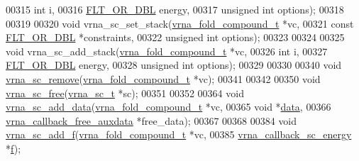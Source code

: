 \begin{DoxyCode}
00315                     \textcolor{keywordtype}{int}                   i,
00316                     \hyperlink{group__data__structures_ga31125aeace516926bf7f251f759b6126}{FLT\_OR\_DBL}            energy,
00317                     \textcolor{keywordtype}{unsigned} \textcolor{keywordtype}{int}          options);
00318 
00319 
00320 \textcolor{keywordtype}{void} vrna\_sc\_set\_stack(\hyperlink{group__fold__compound_structvrna__fc__s}{vrna\_fold\_compound\_t} *vc,
00321                        \textcolor{keyword}{const} \hyperlink{group__data__structures_ga31125aeace516926bf7f251f759b6126}{FLT\_OR\_DBL}     *constraints,
00322                        \textcolor{keywordtype}{unsigned} \textcolor{keywordtype}{int}         options);
00323 
00324 
00325 \textcolor{keywordtype}{void} vrna\_sc\_add\_stack(\hyperlink{group__fold__compound_structvrna__fc__s}{vrna\_fold\_compound\_t} *vc,
00326                        \textcolor{keywordtype}{int}                  i,
00327                        \hyperlink{group__data__structures_ga31125aeace516926bf7f251f759b6126}{FLT\_OR\_DBL}           energy,
00328                        \textcolor{keywordtype}{unsigned} \textcolor{keywordtype}{int}         options);
00329 
00330 
00340 \textcolor{keywordtype}{void} \hyperlink{group__soft__constraints_ga73cdc07b9a199c614367bebef0f2c41a}{vrna\_sc\_remove}(\hyperlink{group__fold__compound_structvrna__fc__s}{vrna\_fold\_compound\_t} *vc);
00341 
00342 
00350 \textcolor{keywordtype}{void} \hyperlink{group__soft__constraints_ga6d55446448d69346fc313b993c4fb3e8}{vrna\_sc\_free}(\hyperlink{group__soft__constraints_structvrna__sc__s}{vrna\_sc\_t} *sc);
00351 
00352 
00364 \textcolor{keywordtype}{void} \hyperlink{group__soft__constraints_ga15c6d52471ec97897e2bb7f964f5deb6}{vrna\_sc\_add\_data}(\hyperlink{group__fold__compound_structvrna__fc__s}{vrna\_fold\_compound\_t}        *vc,
00365                       \textcolor{keywordtype}{void}                        *\hyperlink{group__soft__constraints_a7574680143df97b9029146c2150bf06d}{data},
00366                       \hyperlink{group__fold__compound_ga7806651f51b195013839a218b3bbd5a3}{vrna\_callback\_free\_auxdata}  *free\_data);
00367 
00368 
00384 \textcolor{keywordtype}{void} \hyperlink{group__soft__constraints_ga8c7d907ec0125cd61c04e0908010a4e9}{vrna\_sc\_add\_f}(\hyperlink{group__fold__compound_structvrna__fc__s}{vrna\_fold\_compound\_t}     *vc,
00385                    \hyperlink{group__soft__constraints_ga88a266695d9e25cc12114dceb7b4565e}{vrna\_callback\_sc\_energy}  *\hyperlink{group__soft__constraints_a32dc86090237888c75491bbd4861a04b}{f});

\end{DoxyCode}
